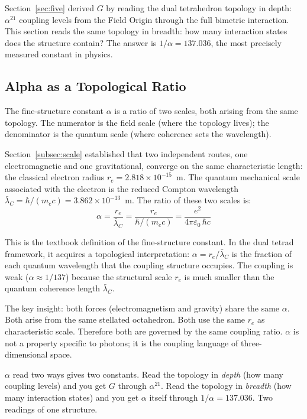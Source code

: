 \documentclass[aps,prd,preprint,superscriptaddress,showpacs,preprintnumbers,amsmath,amssymb,nofootinbib]{revtex4-2}
\begin{document}
Section~\ref{sec:five} derived $G$ by reading the dual tetrahedron topology in depth: $\alpha^{21}$ coupling levels from the Field Origin through the full bimetric interaction. This section reads the same topology in breadth: how many interaction states does the structure contain? The answer is $1/\alpha = 137.036$, the most precisely measured constant in physics.

\subsection{Alpha as a Topological Ratio}
\label{subsec:alpha-scale}

The fine-structure constant $\alpha$ is a ratio of two scales, both arising from the same topology. The numerator is the field scale (where the topology lives); the denominator is the quantum scale (where coherence sets the wavelength).

Section~\ref{subsec:scale} established that two independent routes, one electromagnetic and one gravitational, converge on the same characteristic length: the classical electron radius $r_e = 2.818 \times 10^{-15}$~m. The quantum mechanical scale associated with the electron is the reduced Compton wavelength $\bar{\lambda}_C = \hbar/(m_e c) = 3.862 \times 10^{-13}$~m. The ratio of these two scales is:
\begin{equation}
\alpha = \frac{r_e}{\bar{\lambda}_C} = \frac{r_e}{\hbar/(m_e c)} = \frac{e^2}{4\pi\varepsilon_0\,\hbar c}
\label{eq:alpha-ratio}
\end{equation}

This is the textbook definition of the fine-structure constant. In the dual tetrad framework, it acquires a topological interpretation: $\alpha = r_e / \bar{\lambda}_C$ is the fraction of each quantum wavelength that the coupling structure occupies. The coupling is weak ($\alpha \approx 1/137$) because the structural scale $r_e$ is much smaller than the quantum coherence length $\bar{\lambda}_C$.

The key insight: both forces (electromagnetism and gravity) share the same $\alpha$. Both arise from the same stellated octahedron. Both use the same $r_e$ as characteristic scale. Therefore both are governed by the same coupling ratio. $\alpha$ is not a property specific to photons; it is the coupling language of three-dimensional space.

$\alpha$ read two ways gives two constants. Read the topology in \emph{depth} (how many coupling levels) and you get $G$ through $\alpha^{21}$. Read the topology in \emph{breadth} (how many interaction states) and you get $\alpha$ itself through $1/\alpha = 137.036$. Two readings of one structure.
\end{document}
